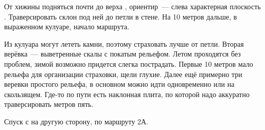 От хижины \geoLighthouse подняться почти до верха
, ориентир~--- слева характерная
плоскость \geoTelevizor. Траверсировать склон под ней до петли в
стене. На 10 метров дальше, в выраженном кулуаре, начало маршрута.

Из кулуара могут лететь камни, поэтому страховать лучше от петли.
Вторая верёвка~--- выветренные скалы с покатым рельефом. Летом
проходятся без проблем, зимой возможно придется слегка пострадать.
Первые 10 метров мало рельефа для организации страховки, щели глухие.
Далее ещё примерно три веревки простого рельефа, в основном можно идти
одновременно или на скользящем. Где-то по пути есть наклонная плита,
по которой надо аккуратно траверсировать метров пять.

Спуск с \geoPeakRacek[вершины] на другую сторону, по маршруту 2А.
